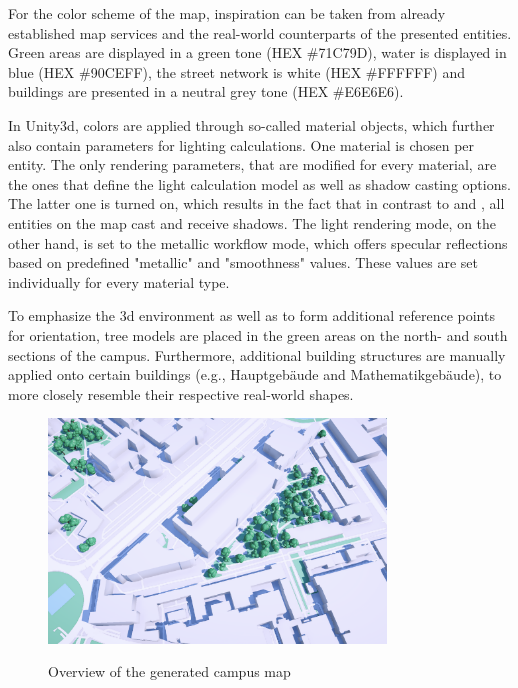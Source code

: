 For the color scheme of the map, inspiration can be taken from already established map services \cite{google_maps_website} \cite{apple_maps_website} and the real-world counterparts of the presented entities. Green areas are displayed in a green tone (HEX \#71C79D), water is displayed in blue (HEX \#90CEFF), the street network is white (HEX \#FFFFFF) and buildings are presented in a neutral grey tone (HEX \#E6E6E6).

In Unity3d, colors are applied through so-called material objects, which further also contain parameters for lighting calculations. One material is chosen per entity. The only rendering parameters, that are modified for every material, are the ones that define the light calculation model as well as shadow casting options. The latter one is turned on, which results in the fact that in contrast to \cite{google_maps_website} and \cite{apple_maps_website}, all entities on the map cast and receive shadows. The light rendering mode, on the other hand, is set to the metallic workflow mode, which offers specular reflections based on predefined "metallic" and "smoothness" values. These values are set individually for every material type.

To emphasize the 3d environment as well as to form additional reference points for orientation, tree models are placed in the green areas on the north- and south sections of the campus. Furthermore, additional building structures are manually applied onto certain buildings (e.g., Hauptgebäude and Mathematikgebäude), to more closely resemble their respective real-world shapes.

\begin{figure}[H]
	\centering
	\includegraphics[width=0.8\textwidth]{images/generated_campus_map.png}\\
	\caption{Overview of the generated campus map}
\end{figure}

